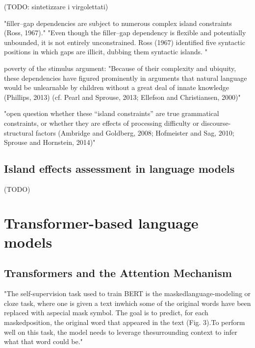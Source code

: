 (TODO: sintetizzare i virgolettati)

"filler–gap dependencies are subject to numerous complex island constraints (Ross, 1967)." \citep{wilcox2018rnn}
"Even though the filler–gap dependency is flexible and potentially unbounded, it is not entirely unconstrained. Ross (1967) identified five syntactic positions in which gaps are illicit, dubbing them
syntactic islands. " \citep{wilcox2018rnn} 

poverty of the stimulus argument:
"Because of their complexity and ubiquity, these dependencies have figured prominently in arguments that natural language would be unlearnable by children without a great deal of innate knowledge (Phillips, 2013) (cf. Pearl and Sprouse, 2013; Ellefson and Christiansen, 2000)" \citep{wilcox2018rnn} 

"open question whether these “island constraints” are true grammatical constraints, or whether they are effects of processing difficulty or discourse-structural factors (Ambridge and Goldberg, 2008; Hofmeister and Sag, 2010; Sprouse and Hornstein, 2014)" \citep{wilcox2018rnn} 



\subsection{Island effects assessment in language models}

(TODO)


\pagebreak

\section{Transformer-based language models}

\subsection{Transformers and the Attention Mechanism}

"The self-supervision task used to train BERT is the maskedlanguage-modeling  or  cloze  task,  where  one  is  given  a  text  inwhich  some  of  the  original  words  have  been  replaced  with  aspecial  mask  symbol.  The  goal  is  to  predict,  for  each  maskedposition,  the  original  word  that  appeared  in  the  text  (Fig.  3).To perform well on this task, the model needs to leverage thesurrounding context to infer what that word could be." \citep{manning2020emergent}

